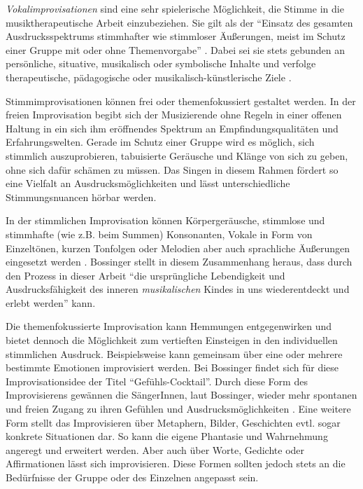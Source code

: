 \emph{Vokalimprovisationen} sind eine sehr spielerische Möglichkeit, die Stimme in die musiktherapeutische Arbeit einzubeziehen. Sie gilt als der "`Einsatz des gesamten Ausdrucksspektrums stimmhafter wie stimmloser Äußerungen, meist im Schutz einer Gruppe mit oder ohne Themenvorgabe"' \autocite[108]{rittner1990}. Dabei sei sie stets gebunden an persönliche, situative, musikalisch oder symbolische Inhalte und verfolge therapeutische, pädagogische oder musikalisch-künstlerische Ziele \autocite[vgl.][109]{rittner1990}. 

Stimmimprovisationen können frei oder themenfokussiert gestaltet werden. In der freien Improvisation begibt sich der Musizierende ohne Regeln in einer offenen Haltung in ein sich ihm eröffnendes Spektrum an Empfindungsqualitäten und Erfahrungswelten. Gerade im Schutz einer Gruppe wird es möglich, sich stimmlich auszuprobieren, tabuisierte Geräusche und Klänge von sich zu geben, ohne sich dafür schämen zu müssen. 
Das Singen in diesem Rahmen fördert so eine Vielfalt an Ausdrucksmöglichkeiten und lässt unterschiedliche Stimmungsnuancen hörbar werden.

In der stimmlichen Improvisation können Körpergeräusche, stimmlose und stimmhafte (wie z.B. beim Summen) Konsonanten, Vokale in Form von Einzeltönen, kurzen Tonfolgen oder Melodien aber auch sprachliche Äußerungen eingesetzt werden \autocite[vgl.][109]{rittner1990}. Bossinger stellt in diesem Zusammenhang heraus, dass durch den Prozess in dieser Arbeit "`die ursprüngliche Lebendigkeit und Ausdrucksfähigkeit des inneren \emph{musikalischen} Kindes in uns wiederentdeckt und erlebt werden"' \autocite[272]{bossinger2006} kann.

Die themenfokussierte Improvisation kann Hemmungen entgegenwirken und bietet dennoch die Möglichkeit zum vertieften Einsteigen in den individuellen stimmlichen Ausdruck. Beispielsweise kann gemeinsam über eine oder mehrere bestimmte Emotionen improvisiert werden. Bei Bossinger findet sich für diese Improvisationsidee der Titel "`Gefühls-Cocktail"'. Durch diese Form des Improvisierens gewännen die SängerInnen, laut Bossinger, wieder mehr spontanen und freien Zugang zu ihren Gefühlen und Ausdrucksmöglichkeiten \autocite[vgl.][273]{bossinger2006}. Eine weitere Form stellt das Improvisieren über Metaphern, Bilder, Geschichten evtl. sogar konkrete Situationen dar. So kann die eigene Phantasie und Wahrnehmung angeregt und erweitert werden. Aber auch über Worte, Gedichte oder Affirmationen lässt sich improvisieren. Diese Formen sollten jedoch stets an die Bedürfnisse der Gruppe oder des Einzelnen angepasst sein.

